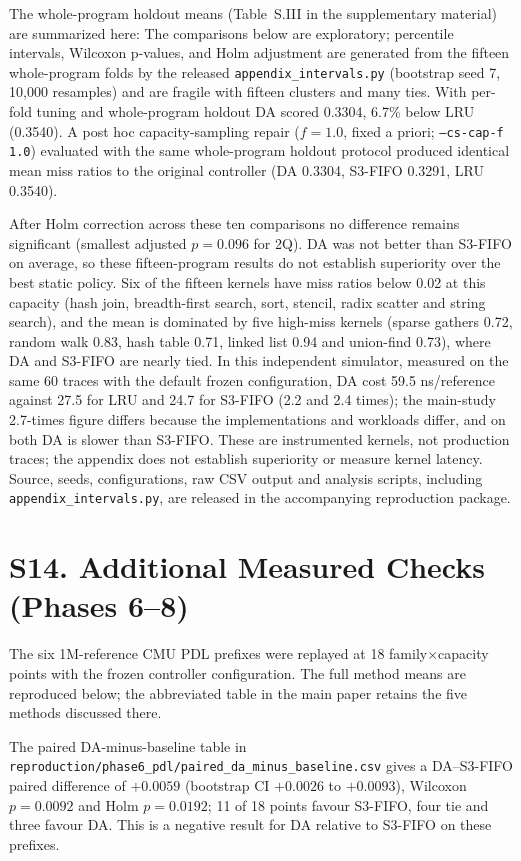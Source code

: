 \documentclass[journal,onecolumn]{IEEEtran}
\begin{document}
The whole-program holdout means (Table~S.III in the supplementary material) are summarized here: The comparisons
below are exploratory; percentile intervals, Wilcoxon p-values, and Holm
adjustment are generated from the fifteen whole-program folds by the released
\texttt{appendix\_intervals.py} (bootstrap seed 7, 10,000 resamples) and are
fragile with fifteen clusters and many ties. With per-fold tuning and
whole-program holdout DA scored 0.3304, 6.7\% below LRU (0.3540). A post hoc
capacity-sampling repair ($f{=}1.0$, fixed a priori; \texttt{--cs-cap-f 1.0})
evaluated with the same whole-program holdout protocol produced identical mean
miss ratios to the original controller (DA 0.3304, S3-FIFO 0.3291, LRU 0.3540).



After Holm correction across these ten comparisons no difference remains
significant (smallest adjusted $p=0.096$ for 2Q). DA was not better than
S3-FIFO on average, so these fifteen-program results do not establish
superiority over the best static policy. Six of the fifteen kernels have miss ratios below 0.02 at this
capacity (hash join, breadth-first search, sort, stencil, radix scatter and
string search), and the mean is dominated by five high-miss kernels (sparse
gathers 0.72, random walk 0.83, hash table 0.71, linked list 0.94 and
union-find 0.73), where DA and S3-FIFO are nearly tied. In this independent
simulator, measured on the same 60 traces with the default frozen
configuration, DA cost 59.5 ns/reference against 27.5 for LRU and 24.7 for
S3-FIFO (2.2 and 2.4 times); the main-study 2.7-times figure differs because
the implementations and workloads differ, and on both DA is slower than
S3-FIFO. These are instrumented kernels, not production traces; the appendix
does not establish superiority or measure kernel latency. Source, seeds,
configurations, raw CSV output and analysis scripts, including
\texttt{appendix\_intervals.py}, are released in the accompanying reproduction
package.


\section{S14. Additional Measured Checks (Phases 6--8)}
The six 1M-reference CMU PDL prefixes were replayed at 18 family$\times$capacity
points with the frozen controller configuration. The full method means are
reproduced below; the abbreviated table in the main paper retains the five
methods discussed there.

The paired DA-minus-baseline table in
\texttt{reproduction/phase6\_pdl/paired\_da\_minus\_baseline.csv} gives a
DA--S3-FIFO paired difference of $+0.0059$ (bootstrap CI $+0.0026$ to
$+0.0093$), Wilcoxon $p=0.0092$ and Holm $p=0.0192$; 11 of 18 points favour
S3-FIFO, four tie and three favour DA. This is a negative result for DA
relative to S3-FIFO on these prefixes.
\end{document}
